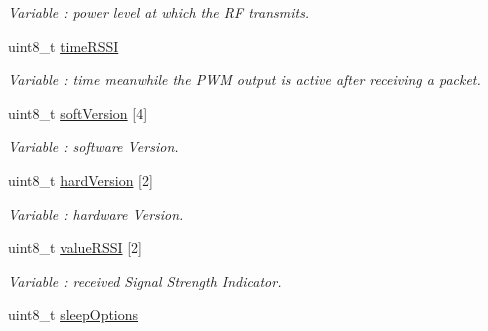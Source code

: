 \begin{DoxyCompactItemize}
\begin{DoxyCompactList}\small\item\em Variable \+: power level at which the RF transmits. \end{DoxyCompactList}\item 
uint8\+\_\+t \hyperlink{class_wasp_x_bee_core_a351e0786529a431ffc26c777a3d5f6ad}{time\+R\+S\+SI}\hypertarget{class_wasp_x_bee_core_a351e0786529a431ffc26c777a3d5f6ad}{}\label{class_wasp_x_bee_core_a351e0786529a431ffc26c777a3d5f6ad}

\begin{DoxyCompactList}\small\item\em Variable \+: time meanwhile the P\+WM output is active after receiving a packet. \end{DoxyCompactList}\item 
uint8\+\_\+t \hyperlink{class_wasp_x_bee_core_a9189f7e52c31b958139dce85d328c442}{soft\+Version} \mbox{[}4\mbox{]}\hypertarget{class_wasp_x_bee_core_a9189f7e52c31b958139dce85d328c442}{}\label{class_wasp_x_bee_core_a9189f7e52c31b958139dce85d328c442}

\begin{DoxyCompactList}\small\item\em Variable \+: software Version. \end{DoxyCompactList}\item 
uint8\+\_\+t \hyperlink{class_wasp_x_bee_core_a49fbd7de02218717a6f2e0ea73c5ea1d}{hard\+Version} \mbox{[}2\mbox{]}\hypertarget{class_wasp_x_bee_core_a49fbd7de02218717a6f2e0ea73c5ea1d}{}\label{class_wasp_x_bee_core_a49fbd7de02218717a6f2e0ea73c5ea1d}

\begin{DoxyCompactList}\small\item\em Variable \+: hardware Version. \end{DoxyCompactList}\item 
uint8\+\_\+t \hyperlink{class_wasp_x_bee_core_ada27b44613ed200461f3ac06ea468fab}{value\+R\+S\+SI} \mbox{[}2\mbox{]}\hypertarget{class_wasp_x_bee_core_ada27b44613ed200461f3ac06ea468fab}{}\label{class_wasp_x_bee_core_ada27b44613ed200461f3ac06ea468fab}

\begin{DoxyCompactList}\small\item\em Variable \+: received Signal Strength Indicator. \end{DoxyCompactList}\item 
uint8\+\_\+t \hyperlink{class_wasp_x_bee_core_acef1b53a9a594104e486155a68866659}{sleep\+Options}\hypertarget{class_wasp_x_bee_core_acef1b53a9a594104e486155a68866659}{}\label{class_wasp_x_bee_core_acef1b53a9a594104e486155a68866659}


\end{DoxyCompactItemize}
